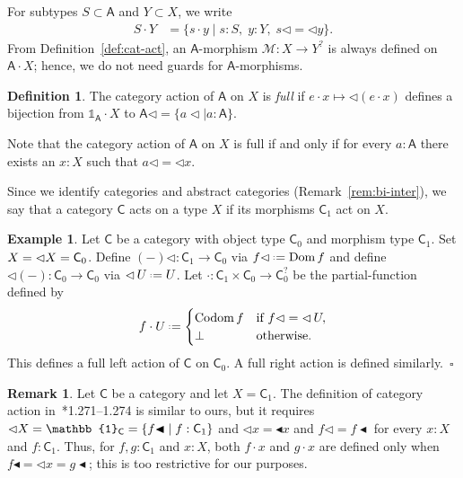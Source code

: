 \documentclass{amsart}
\newcommand{\tin}{:}
\newcommand{\Cat}[1]{\mathsf{#1}}
\newcommand{\cat}[1]{\Cat{#1}}
\newcommand{\acat}[1]{\mathsf{#1}}
\numberwithin{lstfloat}{section}
\DeclareMathOperator{\Dom}{Dom}
\DeclareMathOperator{\Codom}{Codom}
\newcommand{\srcfunc}{\mathbin{\blacktriangleleft}}
\newcommand{\tgtfunc}{\mathbin{\blacktriangleleft}}
\newcommand{\src}[1]{#1\srcfunc}
\newcommand{\tgt}[1]{\tgtfunc #1}
\newcommand{\one}{\mathbb{1}}
\newcommand{\defeq}{\mathrel{\hstretch{.13}{=}\hspace{.2ex}{=}}}
\newcommand{\func}[1]{\mathcal{#1}}
\newcommand{\fM}{\func{M}}
\newcommand{\cA}{\cat{A}}
\newcommand{\cC}{\cat{C}}
\newcommand{\exqed}{\hfill $\square$}
\theoremstyle{definition}
\newtheorem{defn}[thm]{Definition}
\newtheorem{ex}[thm]{Example}
\newtheorem{rem}[thm]{Remark}
\theoremstyle{remark}
\numberwithin{equation}{section}
\begin{document}
For subtypes $S\subset \acat{A}$ and $Y\subset X$, we write
\begin{align*}
  S\cdot Y & = \{ s\cdot y\mid s\tin S,\; y\tin Y,\; s\lhd =\lhd y\}.
\end{align*}
From Definition~\ref{def:cat-act}, an $\acat{A}$-morphism $\fM:X\to Y^?$ is
always defined on $\acat{A}\cdot X$; 
hence, we do not need guards for $\acat{A}$-morphisms. 

\begin{defn}
  The category action of $\acat{A}$ on $X$ is \emph{full} if $e\cdot x \mapsto
  \lhd(e\cdot x)$ defines a bijection from $\one_{\acat{A}}\cdot X$ to
  $\cA\lhd = \{a \lhd \mid a :\acat{A}\}$.
\end{defn}
\noindent
Note that the category action of $\cA$ on $X$ is full if and only if for every 
$a:\cA$ there exists an $x:X$ such that $a\lhd =\lhd x$. 

Since we identify categories and abstract categories (Remark~\ref{rem:bi-inter}), we
say that a category $\cC$ acts on a type $X$ if its morphisms
$\cC_1$ act on $X$.

\begin{ex}
  Let $\cat{C}$ be a category with object type $\cat{C}_0$ and morphism type
  $\cat{C}_1$. Set $X = \myopp = \cat{C}_0$. Define $(-)\lhd : \cat{C}_1 \to
  \cat{C}_0$ via $f\lhd \defeq \Dom f$ and define $\lhd (-) : \cat{C}_0 \to
  \cat{C}_0$ via $\lhd \,U \defeq U$. Let $\cdot : \cat{C}_1 \times \cat{C}_0\to
  \cat{C}_0^?$ be the partial-function defined by 
  \begin{align*}
    f\cdot U \defeq \begin{cases}
      \Codom f & \text{if } f\lhd = \lhd \,U, \\
      \bot & \text{otherwise}.
    \end{cases}
  \end{align*}
  This defines a full left action of $\cat{C}$ on $\acat{C}_0$. A full right
  action is defined similarly.~\exqed
\end{ex}

\begin{rem}
  Let $\acat{C}$ be a category and let $X=\acat{C}_1$. The
  definition of category action 
  in~\cite{FS}*{1.271--1.274} is similar to ours, but it requires
  $\myopp=\one_{\acat{C}}=\{\src{f} \mid f\tin\acat{C}_1\}$ and $\lhd
  x=\tgt{x}$ and $f\lhd =\src{f}$ for every $x\tin X$ and $f\tin
  \acat{C}_1$. Thus, for $f,g\tin \acat{C}_1$ and $x\tin X$, both $f\cdot
  x$ and $g\cdot x$ are defined only when $\src{f}=\lhd x=\src{g}$; this is too
  restrictive for our purposes.
\end{rem}
\end{document}
